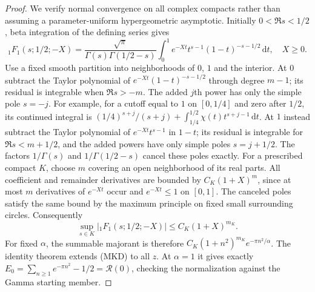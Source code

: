 \documentclass[11pt]{article}
\theoremstyle{remark}\newtheorem{remark}[theorem]{Remark}
\newcommand{\dd}{\,\mathrm d}
\begin{document}
\begin{proof}
We verify normal convergence on all complex compacts rather than
assuming a parameter-uniform hypergeometric asymptotic.
Initially $0<\Re s<1/2$, beta integration of the defining series gives
\[
 {}_1F_1(s;1/2;-X)
 =\frac{\sqrt\pi}{\Gamma(s)\Gamma(1/2-s)}
       \int_0^1e^{-Xt}t^{s-1}(1-t)^{-s-1/2}\dd t,\quad X\ge0.
\]
Use a fixed smooth partition into neighborhoods of $0$, $1$ and
the interior. At $0$ subtract the Taylor polynomial of
$e^{-Xt}(1-t)^{-s-1/2}$ through degree $m-1$; its residual is
integrable when $\Re s>-m$. The added $j$th power has only the
simple pole $s=-j$. For example, for a cutoff equal to $1$ on
$[0,1/4]$ and zero after $1/2$, its continued integral is
$(1/4)^{s+j}/(s+j)+\int_{1/4}^{1/2}\chi(t)t^{s+j-1}\dd t$.
At $1$ instead subtract the Taylor polynomial of
$e^{-Xt}t^{s-1}$ in $1-t$; its residual is integrable for
$\Re s<m+1/2$, and the added powers have only simple poles
$s=j+1/2$. The factors $1/\Gamma(s)$ and $1/\Gamma(1/2-s)$
cancel these poles exactly.
For a prescribed compact $K$, choose $m$ covering an open
neighborhood of its real parts. All coefficient and remainder
derivatives are bounded by $C_K(1+X)^m$, since at most $m$
derivatives of $e^{-Xt}$ occur and $e^{-Xt}\le1$ on $[0,1]$.
The canceled poles satisfy the same bound by the maximum principle
on fixed small surrounding circles. Consequently
\[
 \sup_{s\in K}|{}_1F_1(s;1/2;-X)|\le C_K(1+X)^{m_K}.
\]
For fixed $\alpha$, the summable majorant is therefore
$C_K(1+n^2)^{m_K}e^{-\pi n^2/\alpha}$. The identity theorem
extends (MKD) to all $z$.
At $\alpha=1$ it gives exactly
$E_0=\sum_{n\ge1}e^{-\pi n^2}-1/2=\mathcal R(0)$, checking
the normalization against the Gamma starting member.
\end{proof}
\end{document}

